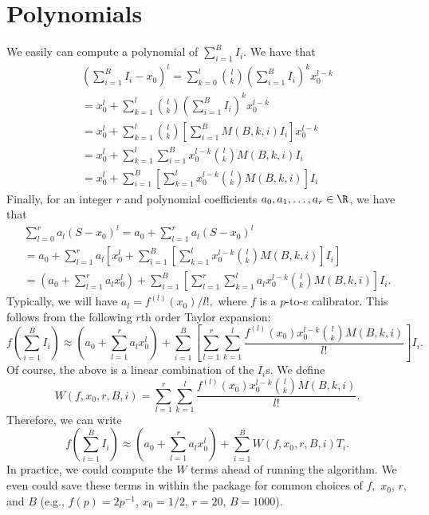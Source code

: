 \documentclass[12pt]{article}
\begin{document}
\section{Polynomials}
We easily can compute a polynomial of $\sum_{i=1}^B I_i.$ We have that
\begin{multline*}
\left( \sum_{i=1}^B I_i - x_0 \right)^l = \sum_{k=0}^l \binom{l}{k} \left( \sum_{i=1}^B I_i \right)^k x_0^{l - k} \\ = x_0^{l} + \sum_{k=1}^l \binom{l}{k} \left( \sum_{i=1}^B I_i \right)^k x_0^{l-k}   \\ = x^l_0 + \sum_{k=1}^l \binom{l}{k} \left[\sum_{i=1}^B M(B,k,i) I_i  \right]x^{l-k}_0 \\ = x_0^l + \sum_{k = 1}^l \sum_{i=1}^B x_0^{l-k} \binom{l}{k} M(B,k,i) I_i \\ = x_0^l +\sum_{i=1}^B \left[\sum_{k=1}^l x_0^{l-k} \binom{l}{k} M(B,k,i) \right] I_i
\end{multline*}
Finally, for an integer $r$ and polynomial coefficients $a_0, a_1, \dots, a_r \in \R$, we have that
\begin{multline*}
\sum_{l=0}^r a_l \left(S - x_0 \right)^l = a_0 + \sum_{l=1}^r a_l (S - x_0)^l \\ = a_0 + \sum_{l=1}^r a_l \left[x_0^l + \sum_{i=1}^B \left[\sum_{k=1}^l x_0^{l-k} \binom{l}{k} M(B,k,i) \right] I_i \right] \\ = \left(a_0 + \sum_{l=1}^r a_l x_0^l \right) + \sum_{i=1}^B \left[ \sum_{l=1}^r \sum_{k=1}^l a_l x_0^{l-k} \binom{l}{k} M(B,k,i) \right] I_i.
\end{multline*}
Typically, we will have $a_l = f^{(l)}(x_0)/l!,$ where $f$ is a $p$-to-$e$ calibrator. This follows from the following $r$th order Taylor expansion:
$$ f\left(\sum_{i=1}^BI_i \right) \approx \left(a_0 + \sum_{l=1}^r a_l x_0^l \right) + \sum_{i=1}^B \left[ \sum_{l=1}^r \sum_{k=1}^l \frac{f^{(l)}(x_0) x_0^{l-k} \binom{l}{k} M(B,k,i)}{l!} \right] I_i.$$ Of course, the above is a linear combination of the $I_i$s. We define
$$ W(f, x_0, r, B, i) = \sum_{l=1}^r \sum_{k=1}^l \frac{f^{(l)}(x_0) x_0^{l-k} \binom{l}{k} M(B,k,i)}{l!}.$$  Therefore, we can write
$$ f\left(\sum_{i=1}^B I_i \right) \approx \left(a_0 + \sum_{l=1}^r a_l x_0^l \right) + \sum_{i=1}^B W(f, x_0, r, B, i) T_i.$$
In practice, we could compute the $W$ terms ahead of running the algorithm. We even could save these terms in within the package for common choices of $f,$ $x_0$, $r$, and $B$ (e.g., $f(p) = 2p^{-1}$, $x_0 = 1/2$, $r = 20$, $B = 1000$).
\end{document}
